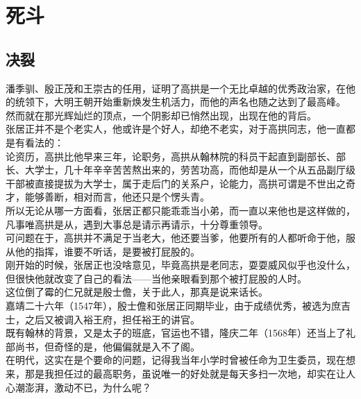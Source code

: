 \section{死斗}
\ifnum{}
	\begin{multicols}{\theparacolNo}
\fi
\subsection{决裂}
潘季驯、殷正茂和王崇古的任用，证明了高拱是一个无比卓越的优秀政治家，在他的统领下，大明王朝开始重新焕发生机活力，而他的声名也随之达到了最高峰。\\

然而就在那光辉灿烂的顶点，一个阴影却已悄然出现，出现在他的背后。\\

张居正并不是个老实人，他或许是个好人，却绝不老实，对于高拱同志，他一直都是有看法的：\\

论资历，高拱比他早来三年，论职务，高拱从翰林院的科员干起直到副部长、部长、大学士，几十年辛辛苦苦熬出来的，劳苦功高，而他却是从一个从五品副厅级干部被直接提拔为大学士，属于走后门的关系户，论能力，高拱可谓是不世出之奇才，能够善断，相对而言，他还只是个愣头青。\\

所以无论从哪一方面看，张居正都只能乖乖当小弟，而一直以来他也是这样做的，凡事唯高拱是从，遇到大事总是请示再请示，十分尊重领导。\\

可问题在于，高拱并不满足于当老大，他还要当爹，他要所有的人都听命于他，服从他的指挥，谁要不听话，是要被打屁股的。\\

刚开始的时候，张居正也没啥意见，毕竟高拱是老同志，耍耍威风似乎也没什么，但很快他就改变了自己的看法——当他亲眼看到那个被打屁股的人时。\\

这位倒了霉的仁兄就是殷士儋，关于此人，那真是说来话长。\\

嘉靖二十六年（1547年），殷士儋和张居正同期毕业，由于成绩优秀，被选为庶吉士，之后又被调入裕王府，担任裕王的讲官。\\

既有翰林的背景，又是太子的班底，官运也不错，隆庆二年（1568年）还当上了礼部尚书，但奇怪的是，他偏偏就是入不了阁。\\

在明代，这实在是个要命的问题，记得我当年小学时曾被任命为卫生委员，现在想来，那是我担任过的最高职务，虽说唯一的好处就是每天多扫一次地，却实在让人心潮澎湃，激动不已，为什么呢？\\


\end{multicols}

